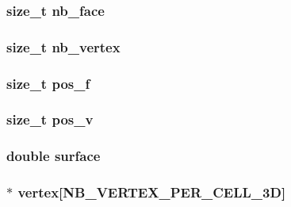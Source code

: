 \hypertarget{classFVCell3D_acafc91cfd098750db0bcbe840dbb283c}{
\subsubsection[{nb\_\-face}]{\setlength{\rightskip}{0pt plus 5cm}size\_\-t {\bf nb\_\-face}}}
\label{d0/ded/classFVCell3D_acafc91cfd098750db0bcbe840dbb283c}
\hypertarget{classFVCell3D_a0a063e99fbc85e837d93dfbcda6f5252}{
\subsubsection[{nb\_\-vertex}]{\setlength{\rightskip}{0pt plus 5cm}size\_\-t {\bf nb\_\-vertex}}}
\label{d0/ded/classFVCell3D_a0a063e99fbc85e837d93dfbcda6f5252}
\hypertarget{classFVCell3D_a22e92dae91397209d0da1e056358fbd7}{
\subsubsection[{pos\_\-f}]{\setlength{\rightskip}{0pt plus 5cm}size\_\-t {\bf pos\_\-f}}}
\label{d0/ded/classFVCell3D_a22e92dae91397209d0da1e056358fbd7}
\hypertarget{classFVCell3D_a9edf0688f0159bed5d3a6828f63146fd}{
\subsubsection[{pos\_\-v}]{\setlength{\rightskip}{0pt plus 5cm}size\_\-t {\bf pos\_\-v}}}
\label{d0/ded/classFVCell3D_a9edf0688f0159bed5d3a6828f63146fd}
\hypertarget{classFVCell3D_aec4a2e345c6aacee9bb86c610f0bfab6}{
\subsubsection[{surface}]{\setlength{\rightskip}{0pt plus 5cm}double {\bf surface}}}
\label{d0/ded/classFVCell3D_aec4a2e345c6aacee9bb86c610f0bfab6}
\hypertarget{classFVCell3D_a7fe38788ed0792b47203a4fb432f523a}{
\subsubsection[{vertex}]{$\ast$ {\bf vertex}\mbox{[}NB\_\-VERTEX\_\-PER\_\-CELL\_\-3D\mbox{]}}}
